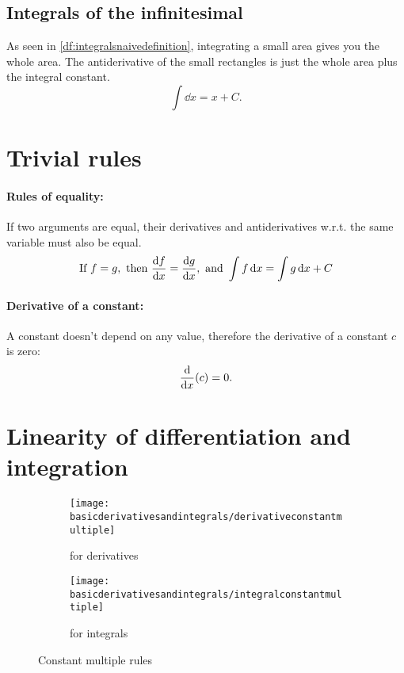 \subsection{Integrals of the infinitesimal}
As seen in \cref{df:integralsnaivedefinition}, integrating a small area gives you the whole area. The antiderivative of the small rectangles is just the whole area plus the integral constant. 
\begin{equation}
    \int \dd{x} = x + C.
\end{equation}

\section{Trivial rules}
\label{sec:rulesofequality}

\paragraph{Rules of equality:} If two arguments are equal, their derivatives and antiderivatives w.r.t. the same variable must also be equal.
\begin{equation*}
    \textrm{If}~f = g,\textrm{ then }\dv{f}{x} = \dv{g}{x},\textrm{ and }\int f\dd{x} = \int g\dd{x} + C
\end{equation*}

\paragraph{Derivative of a constant:} A constant doesn't depend on any value, therefore the derivative of a constant $c$ is zero:
\begin{equation}
    \dv{x}(c) = 0.
\end{equation}

\section{Linearity of differentiation and integration}
\begin{figure}[h]
    \centering
    \begin{subfigure}[t]{0.75\textwidth}
        \centering
        \texttt{[image: basicderivativesandintegrals/derivativeconstantmultiple]}
        \caption{for derivatives}
        \label{fig:derivativesconstantmultiple}
    \end{subfigure}
    \begin{subfigure}[b]{0.36\textwidth}
        \centering
        \texttt{[image: basicderivativesandintegrals/integralconstantmultiple]}
        \caption{for integrals}
        \label{fig:integralsconstantmultiple}
    \end{subfigure}
    \caption{Constant multiple rules}
\end{figure}

